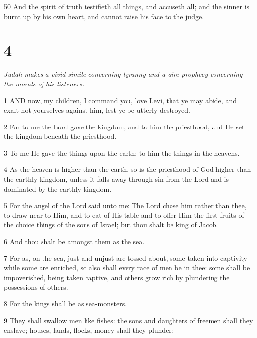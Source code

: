 \par 50 And the spirit of truth testifieth all things, and accuseth all; and the sinner is burnt up by his own heart, and cannot raise his face to the judge.

\chapter{4}

\par \textit{Judah makes a vivid simile concerning tyranny and a dire prophecy concerning the morals of his listeners.}

\par 1 AND now, my children, I command you, love Levi, that ye may abide, and exalt not yourselves against him, lest ye be utterly destroyed.

\par 2 For to me the Lord gave the kingdom, and to him the priesthood, and He set the kingdom beneath the priesthood.

\par 3 To me He gave the things upon the earth; to him the things in the heavens.

\par 4 As the heaven is higher than the earth, so is the priesthood of God higher than the earthly kingdom, unless it falls away through sin from the Lord and is dominated by the earthly kingdom.

\par 5 For the angel of the Lord said unto me: The Lord chose him rather than thee, to draw near to Him, and to eat of His table and to offer Him the first-fruits of the choice things of the sons of Israel; but thou shalt be king of Jacob.

\par 6 And thou shalt be amongst them as the sea.

\par 7 For as, on the sea, just and unjust are tossed about, some taken into captivity while some are enriched, so also shall every race of men be in thee: some shall be impoverished, being taken captive, and others grow rich by plundering the possessions of others.

\par 8 For the kings shall be as sea-monsters.

\par 9 They shall swallow men like fishes: the sons and daughters of freemen shall they enslave; houses, lands, flocks, money shall they plunder:

